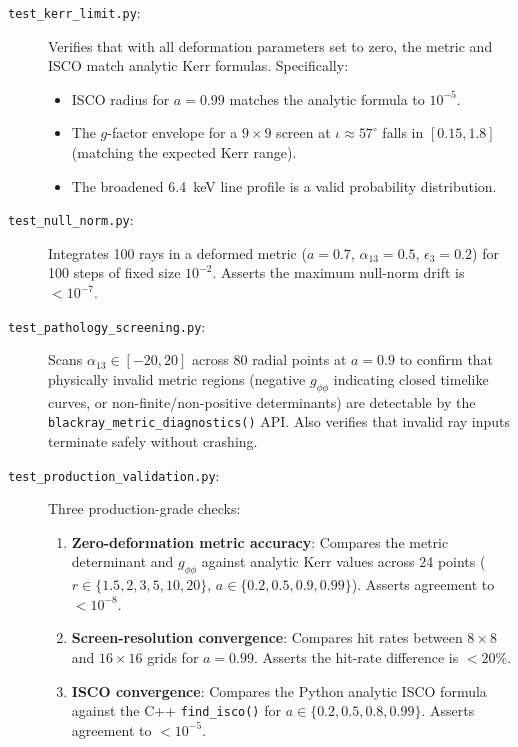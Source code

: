 \documentclass[11pt,twoside]{article}
\begin{document}
\begin{description}
\item[\texttt{test\_kerr\_limit.py}:] Verifies that with all deformation
parameters set to zero, the metric and ISCO match analytic Kerr formulas.
Specifically:
\begin{itemize}
\item ISCO radius for $a=0.99$ matches the analytic formula to $10^{-5}$.
\item The $g$-factor envelope for a $9\times9$ screen at $\iota \approx 57^\circ$
falls in $[0.15, 1.8]$ (matching the expected Kerr range).
\item The broadened 6.4~keV line profile is a valid probability distribution.
\end{itemize}

\item[\texttt{test\_null\_norm.py}:] Integrates 100 rays in a deformed metric
($a=0.7$, $\alpha_{13}=0.5$, $\epsilon_3=0.2$) for 100 steps of fixed size
$10^{-2}$. Asserts the maximum null-norm drift is $< 10^{-7}$.

\item[\texttt{test\_pathology\_screening.py}:] Scans $\alpha_{13} \in [-20, 20]$
across 80 radial points at $a=0.9$ to confirm that physically invalid metric
regions (negative $g_{\phi\phi}$ indicating closed timelike curves, or
non-finite/non-positive determinants) are detectable by the
\texttt{blackray\_metric\_diagnostics()} API. Also verifies that invalid ray
inputs terminate safely without crashing.

\item[\texttt{test\_production\_validation.py}:] Three production-grade checks:
\begin{enumerate}
\item \textbf{Zero-deformation metric accuracy}: Compares the metric determinant
and $g_{\phi\phi}$ against analytic Kerr values across 24 points
($r \in \{1.5, 2, 3, 5, 10, 20\}$, $a \in \{0.2, 0.5, 0.9, 0.99\}$).
Asserts agreement to $< 10^{-8}$.
\item \textbf{Screen-resolution convergence}: Compares hit rates between
$8\times8$ and $16\times16$ grids for $a=0.99$. Asserts the hit-rate difference
is $< 20\%$.
\item \textbf{ISCO convergence}: Compares the Python analytic ISCO formula
against the C++ \texttt{find\_isco()} for $a \in \{0.2, 0.5, 0.8, 0.99\}$.
Asserts agreement to $< 10^{-5}$.
\end{enumerate}
\end{description}
\end{document}
